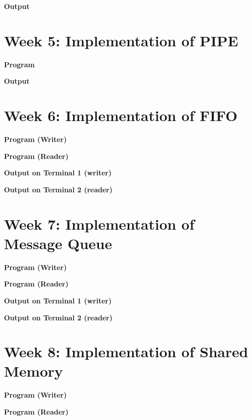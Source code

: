 \documentclass{article}
\begin{document}
\newpage
\noindent \textbf{\large{Output}}


\newpage
\section{Week 5: Implementation of PIPE}

\noindent \textbf{\large{Program}}


\newpage
\noindent \textbf{\large{Output}}


\newpage
\section{Week 6: Implementation of FIFO}

\noindent \textbf{\large{Program (Writer)}}


\newpage
\noindent \textbf{\large{Program (Reader)}}


\newpage
\noindent \textbf{\large{Output} on Terminal 1 (writer)}


\noindent \textbf{\large{Output} on Terminal 2 (reader)}


\newpage
\section{Week 7: Implementation of Message Queue}

\noindent \textbf{\large{Program (Writer)}}


\newpage
\noindent \textbf{\large{Program (Reader)}}


\newpage
\noindent \textbf{\large{Output} on Terminal 1 (writer)}


\noindent \textbf{\large{Output} on Terminal 2 (reader)} 


\newpage
\section{Week 8: Implementation of Shared Memory}

\noindent \textbf{\large{Program (Writer)}}


\newpage
\noindent \textbf{\large{Program (Reader)}}

\end{document}
